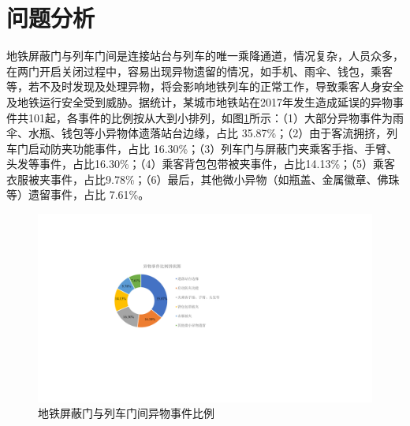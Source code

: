 \section{问题分析}
地铁屏蔽门与列车门间是连接站台与列车的唯一乘降通道，情况复杂，人员众多，在两门开启关闭过程中，容易出现异物遗留的情况，如手机、雨伞、钱包，乘客等，若不及时发现及处理异物，将会影响地铁列车的正常工作，导致乘客人身安全及地铁运行安全受到威胁。据统计\cite{刘伟铭2019地铁风险空间分析及异物检测系统技术要求}，某城市地铁站在2017年发生造成延误的异物事件共101起，各事件的比例按从大到小排列，如图\ref{异物事件比例}所示：（1）大部分异物事件为雨伞、水瓶、钱包等小异物体遗落站台边缘，占比 35.87\%；（2）由于客流拥挤，列车门启动防夹功能事件，占比 16.30\%；（3）列车门与屏蔽门夹乘客手指、手臂、头发等事件，占比16.30\%；（4）乘客背包包带被夹事件，占比14.13\%；（5）乘客衣服被夹事件，占比9.78\%；（6）最后，其他微小异物（如瓶盖、金属徽章、佛珠等）遗留事件，占比 7.61\%。
\begin{figure}[htbp]
	\centering
	\includegraphics[scale=1]{Fig/异物比例.pdf}
	\caption{\label{异物事件比例}地铁屏蔽门与列车门间异物事件比例}
\end{figure}

